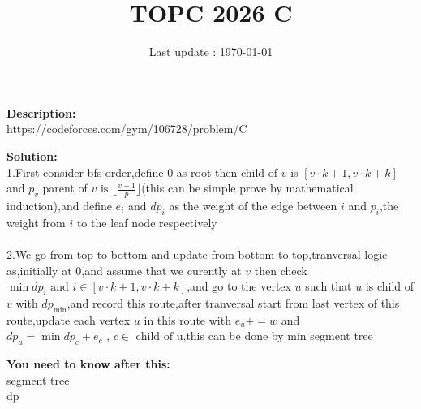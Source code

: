\documentclass{article}
\begin{document}
\title{\textbf{TOPC 2026 C}}
\author{}
\date{Last update : \today}

\maketitle

\noindent \textbf{Description:}\\
https://codeforces.com/gym/106728/problem/C

\noindent \textbf{Solution:}\\
1.First consider bfs order,define $0$ as root then child of $v$ is $[v\cdot k+1,v\cdot k+k]$ and $p_v$ parent of $v\text{ is }\lfloor \frac{v-1}{p}\rfloor$(this can be simple prove by mathematical induction),and define $e_i$ and $dp_i$ as the weight of the edge between $i$ and $p_i$,the weight from $i$ to the leaf node respectively\\
\\
2.We go from top to bottom and update from bottom to top,tranversal logic as,initially at $0$,and assume that we curently at $v$ then check $\min dp_i \text{ and }i\in[v\cdot k+1,v\cdot k+k]$,and go to the vertex $u$ such that $u$ is child of $v$ with $dp_{\min}$,and record this route,after tranversal start from last vertex of this route,update each vertex $u$ in this route with $e_u+=w$ and $dp_u=\min dp_c+e_c\text{ , }c\in \text{ child of u}$,this can be done by min segment tree

\noindent \textbf{You need to know after this:}\\
segment tree\\
dp
\end{document}
